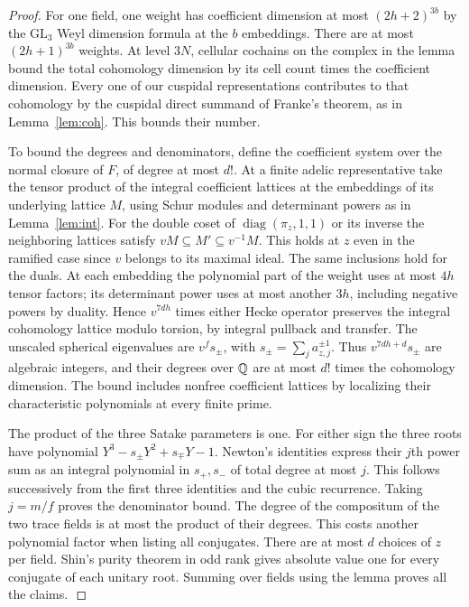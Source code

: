 \documentclass[a4paper,11pt]{article}
\theoremstyle{definition}
\theoremstyle{remark}
\numberwithin{equation}{section}
\begin{document}
\begin{proof}
For one field, one weight has coefficient dimension at most
\((2h+2)^{3b}\) by the \(\mathrm{GL}_3\) Weyl dimension
formula at the \(b\) embeddings. There are at most
\((2h+1)^{3b}\) weights. At level \(3N\), cellular cochains on
the complex in the lemma bound the total cohomology dimension
by its cell count times the coefficient dimension. Every one
of our cuspidal representations contributes to that cohomology
by the cuspidal direct summand of Franke's theorem, as in
Lemma~\ref{lem:coh}. This bounds their number.
\,\cite{VIII-VI-V-franke}

To bound the degrees and denominators, define the coefficient
system over the normal closure of \(F\), of degree at most
\(d!\). At a finite adelic representative take the tensor
product of the integral coefficient lattices at the embeddings
of its underlying lattice \(M\), using Schur modules and
determinant powers as in Lemma~\ref{lem:int}. For the double
coset of \(\operatorname{diag}(\pi_z,1,1)\) or its inverse the
neighboring lattices satisfy \(vM\subseteq M'\subseteq v^{-1}M\).
This holds at \(z\) even in the ramified case since \(v\) belongs
to its maximal ideal. The same inclusions hold for the duals.
At each embedding the polynomial part of the weight uses at
most \(4h\) tensor factors; its determinant power uses at most
another \(3h\), including negative powers by duality. Hence
\(v^{7dh}\) times either Hecke operator preserves the integral
cohomology lattice modulo torsion, by integral pullback and
transfer. The unscaled spherical eigenvalues are
\(v^f s_{\pm}\), with \(s_{\pm}=\sum_j a_{z,j}^{\pm1}\).
Thus \(v^{7dh+d}s_{\pm}\) are algebraic integers, and their
degrees over \(\mathbb Q\) are at most \(d!\) times the cohomology
dimension. The bound includes nonfree coefficient lattices by
localizing their characteristic polynomials at every finite
prime.

The product of the three Satake parameters is one. For either
sign the three roots have polynomial
\(Y^3-s_\pm Y^2+s_\mp Y-1\). Newton's identities express their
\(j\)th power sum as an integral polynomial in \(s_+,s_-\) of
total degree at most \(j\). This follows successively from the
first three identities and the cubic recurrence. Taking
\(j=m/f\) proves the denominator bound. The degree of the
compositum of the two trace fields is at most the product of
their degrees. This costs another polynomial factor when listing
all conjugates. There are at most \(d\) choices of \(z\) per
field. Shin's purity theorem in odd rank gives absolute value
one for every conjugate of each unitary root. Summing over fields
using the lemma proves all the claims.\,\cite{VIII-VI-V-shin}
\end{proof}
\end{document}
